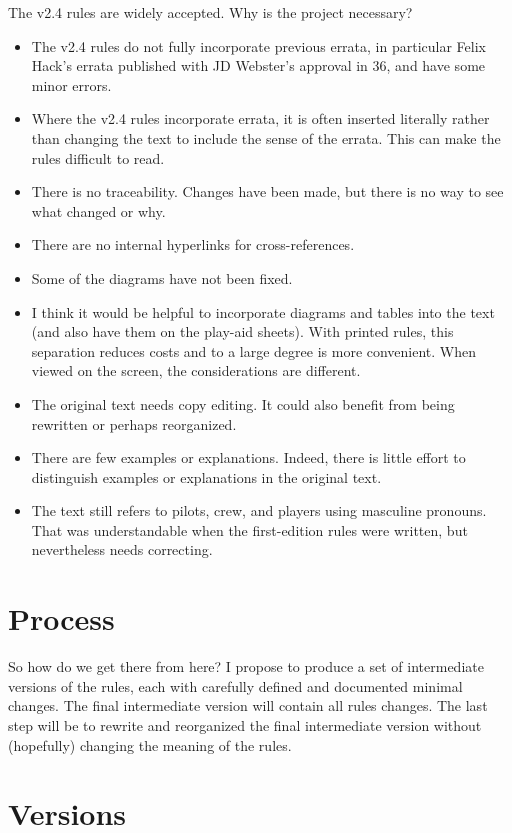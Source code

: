 \documentclass[10pt]{report}
\begin{document}
The v2.4 rules are widely accepted. Why is the project necessary?
\begin{itemize}
    \item The v2.4 rules do not fully incorporate previous errata, in particular Felix Hack’s errata published with JD Webster's approval in {\APJ} 36, and have some minor errors.
    \item Where the v2.4 rules incorporate errata, it is often inserted literally rather than changing the text to include the sense of the errata. This can make the rules difficult to read.
    \item There is no traceability. Changes have been made, but there is no way to see what changed or why.
    \item There are no internal hyperlinks for cross-references.
    \item Some of the diagrams have not been fixed.
    \item I think it would be helpful to incorporate diagrams and tables into the text (and also have them on the play-aid sheets). With printed rules, this separation reduces costs and to a large degree is more convenient. When viewed on the screen, the considerations are different.
    \item The original text needs copy editing. It could also benefit from being rewritten or perhaps reorganized.
    \item There are few examples or explanations. Indeed, there is little effort to distinguish examples or explanations in the original text.
    \item The text still refers to pilots, crew, and players using masculine pronouns. That was understandable when the first-edition rules were written, but nevertheless needs correcting.
\end{itemize}

\section{Process}

So how do we get there from here? I propose to produce a set of intermediate versions of the rules, each with carefully defined and documented minimal changes. The final intermediate version will contain all rules changes. The last step will be to rewrite and reorganized the final intermediate version without (hopefully) changing the meaning of the rules.

\section{Versions}
\end{document}
